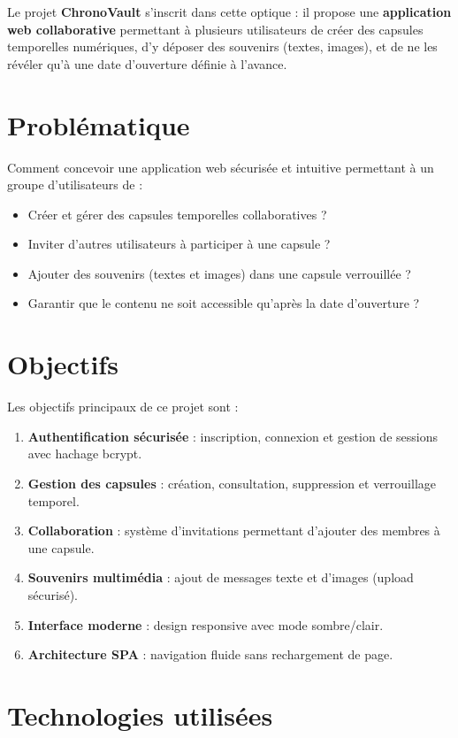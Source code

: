 \documentclass[12pt,a4paper]{report}
\begin{document}
Le projet \textbf{ChronoVault} s'inscrit dans cette optique : il propose une \textbf{application web collaborative} permettant à plusieurs utilisateurs de créer des capsules temporelles numériques, d'y déposer des souvenirs (textes, images), et de ne les révéler qu'à une date d'ouverture définie à l'avance.

\section{Problématique}

Comment concevoir une application web sécurisée et intuitive permettant à un groupe d'utilisateurs de :
\begin{itemize}[noitemsep]
    \item Créer et gérer des capsules temporelles collaboratives ?
    \item Inviter d'autres utilisateurs à participer à une capsule ?
    \item Ajouter des souvenirs (textes et images) dans une capsule verrouillée ?
    \item Garantir que le contenu ne soit accessible qu'après la date d'ouverture ?
\end{itemize}

\section{Objectifs}

Les objectifs principaux de ce projet sont :
\begin{enumerate}[noitemsep]
    \item \textbf{Authentification sécurisée} : inscription, connexion et gestion de sessions avec hachage bcrypt.
    \item \textbf{Gestion des capsules} : création, consultation, suppression et verrouillage temporel.
    \item \textbf{Collaboration} : système d'invitations permettant d'ajouter des membres à une capsule.
    \item \textbf{Souvenirs multimédia} : ajout de messages texte et d'images (upload sécurisé).
    \item \textbf{Interface moderne} : design responsive avec mode sombre/clair.
    \item \textbf{Architecture SPA} : navigation fluide sans rechargement de page.
\end{enumerate}

\section{Technologies utilisées}
\end{document}
